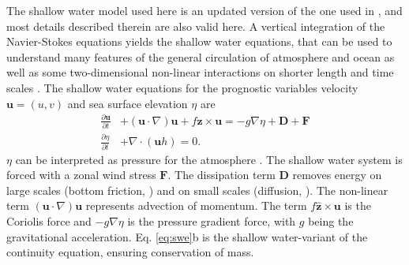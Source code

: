 The shallow water model used here is an updated version of the one used in \cite{Klower2019a}, and most details described
therein are also valid here. A vertical integration of the Navier-Stokes equations yields the shallow water equations, that can
be used to understand many features of the general circulation of atmosphere and ocean as well as some two-dimensional
non-linear interactions on shorter length and time scales \citep{Gill1982,Vallis2006}. The shallow water equations for the
prognostic variables velocity $\mathbf{u} = (u,v)$ and sea surface elevation $\eta$ are
\begin{subequations}
\begin{align}
\frac{\partial \mathbf{u}}{\partial t} &+ (\mathbf{u} \cdot \nabla) \mathbf{u} +
f\hat{\mathbf{z}} \times \mathbf{u} = -g\nabla \eta + \mathbf{D} + \mathbf{F} \\
\frac{\partial \eta}{\partial t} &+ \nabla \cdot (\mathbf{u}h) = 0.
\end{align}
\label{eq:swe}%
\end{subequations}
$\eta$ can be interpreted as pressure for the atmosphere \citep{Gill1982}. The shallow water system is forced with a zonal
wind stress $\mathbf{F}$. The dissipation term $\mathbf{D}$ removes energy on large scales (bottom friction, \cite{Arbic2008})
and on small scales (diffusion, \citep{Griffies2000}). The non-linear term $(\mathbf{u} \cdot \nabla) \mathbf{u}$ represents advection of
momentum. The term $f\hat{\mathbf{z}} \times \mathbf{u}$ is the Coriolis force and $-g\nabla \eta$ is the pressure gradient
force, with $g$ being the gravitational acceleration. Eq. \ref{eq:swe}b is the shallow water-variant of the continuity equation,
ensuring conservation of mass.


